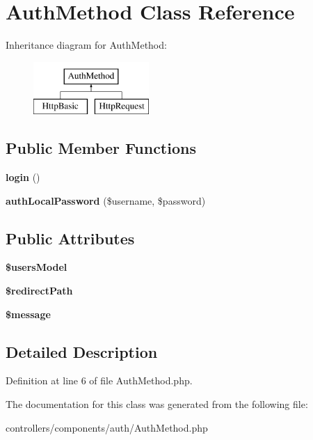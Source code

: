 \hypertarget{class_auth_method}{
\section{AuthMethod Class Reference}
\label{class_auth_method}
}
Inheritance diagram for AuthMethod:\begin{figure}[H]
\begin{center}
\leavevmode
\includegraphics[height=2.000000cm]{class_auth_method}
\end{center}
\end{figure}
\subsection*{Public Member Functions}
\begin{DoxyCompactItemize}
\item 
\hypertarget{class_auth_method_a1c76e60ce0bc7d05cc5ff374e1406a84}{
{\bfseries login} ()}
\label{class_auth_method_a1c76e60ce0bc7d05cc5ff374e1406a84}

\item 
\hypertarget{class_auth_method_a0146c4ad800d3e740879cbafaf8739aa}{
{\bfseries authLocalPassword} (\$username, \$password)}
\label{class_auth_method_a0146c4ad800d3e740879cbafaf8739aa}

\end{DoxyCompactItemize}
\subsection*{Public Attributes}
\begin{DoxyCompactItemize}
\item 
\hypertarget{class_auth_method_a58dd35da09878b7efb950c360e5c8e74}{
{\bfseries \$usersModel}}
\label{class_auth_method_a58dd35da09878b7efb950c360e5c8e74}

\item 
\hypertarget{class_auth_method_a602639730c8f27ba30d8d6373c8cad38}{
{\bfseries \$redirectPath}}
\label{class_auth_method_a602639730c8f27ba30d8d6373c8cad38}

\item 
\hypertarget{class_auth_method_a5ab3782715a00b6e43d9cfbe39a550af}{
{\bfseries \$message}}
\label{class_auth_method_a5ab3782715a00b6e43d9cfbe39a550af}

\end{DoxyCompactItemize}


\subsection{Detailed Description}


Definition at line 6 of file AuthMethod.php.



The documentation for this class was generated from the following file:\begin{DoxyCompactItemize}
\item 
controllers/components/auth/AuthMethod.php\end{DoxyCompactItemize}
